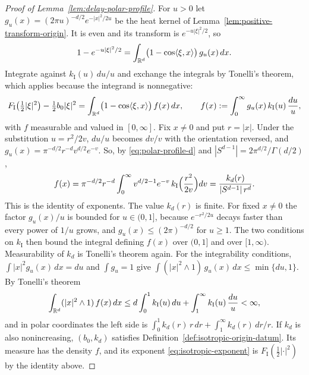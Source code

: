 \begin{proof}[Proof of Lemma~\ref{lem:delay-polar-profile}]
For $u > 0$ let $g_u(x) = (2\pi u)^{-d/2}e^{-|x|^2/2u}$ be the heat kernel of
Lemma~\ref{lem:positive-transform-origin}. It is even and its transform is $e^{-u|\xi|^2/2}$, so
\[
  1 - e^{-u|\xi|^2/2} = \int_{\mathbb{R}^d}\bigl(1 - \cos\langle\xi,x\rangle\bigr)\,g_u(x)\,dx .
\]
Integrate against $k_{\mathrm I}(u)\,du/u$ and exchange the integrals by Tonelli's theorem, which
applies because the integrand is nonnegative:
\[
  F_{\mathrm I}\bigl(\tfrac12|\xi|^2\bigr) - \tfrac12 b_0|\xi|^2
   = \int_{\mathbb{R}^d}\bigl(1 - \cos\langle\xi,x\rangle\bigr)\,f(x)\,dx ,
  \qquad f(x) := \int_0^\infty g_u(x)\,k_{\mathrm I}(u)\,\frac{du}{u} ,
\]
with $f$ measurable and valued in $[0,\infty]$. Fix $x \ne 0$ and put $r = |x|$. Under the
substitution $u = r^2/2v$, $du/u$ becomes $dv/v$ with the orientation reversed, and
$g_u(x) = \pi^{-d/2}r^{-d}v^{d/2}e^{-v}$. So, by \ref{eq:polar-profile-d} and
$|S^{d-1}| = 2\pi^{d/2}/\Gamma(d/2)$,
\[
  f(x) = \pi^{-d/2}r^{-d}\int_0^\infty v^{d/2-1}e^{-v}\,k_{\mathrm I}\Bigl(\frac{r^2}{2v}\Bigr)dv
   = \frac{k_d(r)}{|S^{d-1}|\,r^d} .
\]
This is the identity of exponents. The value $k_d(r)$ is finite. For fixed $x \ne 0$ the factor
$g_u(x)/u$ is bounded for $u \in (0,1]$, because $e^{-r^2/2u}$ decays faster than every power of
$1/u$ grows, and $g_u(x) \le (2\pi)^{-d/2}$ for $u \ge 1$. The two conditions on $k_{\mathrm I}$
then bound the integral defining $f(x)$ over $(0,1]$ and over $[1,\infty)$. Measurability of $k_d$
is Tonelli's theorem again. For the integrability conditions, $\int|x|^2g_u(x)\,dx = du$ and
$\int g_u = 1$ give $\int(|x|^2 \wedge 1)\,g_u(x)\,dx \le \min\{du, 1\}$. By Tonelli's theorem
\[
  \int_{\mathbb{R}^d}(|x|^2 \wedge 1)\,f(x)\,dx \le d\int_0^1 k_{\mathrm I}(u)\,du
   + \int_1^\infty k_{\mathrm I}(u)\,\frac{du}{u} < \infty ,
\]
and in polar coordinates the left side is $\int_0^1 k_d(r)\,r\,dr + \int_1^\infty k_d(r)\,dr/r$.
If $k_d$ is also nonincreasing, $(b_0,k_d)$ satisfies Definition~\ref{def:isotropic-origin-datum}. Its
\Levy{} measure has the density $f$, and its exponent \ref{eq:isotropic-exponent} is
$F_{\mathrm I}(\tfrac12|\cdot|^2)$ by the identity above.
\end{proof}

